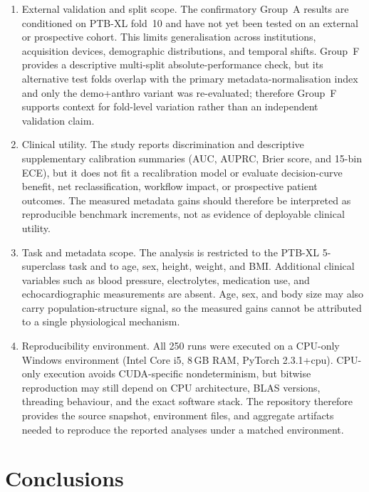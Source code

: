 \documentclass[mathematics,article,pdftex]{Definitions/mdpi}
\def\texttt#1{#1}%
\def\textbf#1{#1}%
\begin{document}
\begin{enumerate}[leftmargin=1.4em]
    \item \textbf{External validation and split scope.} The confirmatory Group~A results are conditioned on PTB-XL fold~10 and have not yet been tested on an external or prospective cohort. This limits generalisation across institutions, acquisition devices, demographic distributions, and temporal shifts. Group~F provides a descriptive multi-split absolute-performance check, but its alternative test folds overlap with the primary metadata-normalisation index and only the \texttt{demo+anthro} variant was re-evaluated; therefore Group~F supports context for fold-level variation rather than an independent validation claim.
    \item \textbf{Clinical utility.} The study reports discrimination and descriptive supplementary calibration summaries (AUC, AUPRC, Brier score, and 15-bin ECE), but it does not fit a recalibration model or evaluate decision-curve benefit, net reclassification, workflow impact, or prospective patient outcomes. The measured metadata gains should therefore be interpreted as reproducible benchmark increments, not as evidence of deployable clinical utility.
    \item \textbf{Task and metadata scope.} The analysis is restricted to the PTB-XL 5-superclass task and to age, sex, height, weight, and BMI. Additional clinical variables such as blood pressure, electrolytes, medication use, and echocardiographic measurements are absent. Age, sex, and body size may also carry population-structure signal, so the measured gains cannot be attributed to a single physiological mechanism.
    \item \textbf{Reproducibility environment.} All 250 runs were executed on a CPU-only Windows environment (Intel Core i5, 8\,GB RAM, PyTorch 2.3.1+cpu). CPU-only execution avoids CUDA-specific nondeterminism, but bitwise reproduction may still depend on CPU architecture, BLAS versions, threading behaviour, and the exact software stack. The repository therefore provides the source snapshot, environment files, and aggregate artifacts needed to reproduce the reported analyses under a matched environment.
\end{enumerate}

\section{Conclusions}\label{sec:conclusion}
\end{document}
